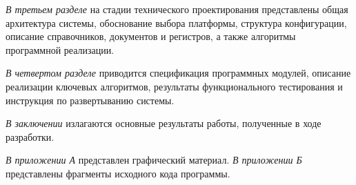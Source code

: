 \textit{В третьем разделе} на стадии технического проектирования представлены общая архитектура системы, обоснование выбора платформы, структура конфигурации, описание справочников, документов и регистров, а также алгоритмы программной реализации.

\textit{В четвертом разделе} приводится спецификация программных модулей, описание реализации ключевых алгоритмов, результаты функционального тестирования и инструкция по развертыванию системы.

\textit{В заключении} излагаются основные результаты работы, полученные в ходе разработки.

\textit{В приложении А} представлен графический материал. \textit{В приложении Б} представлены фрагменты исходного кода программы.